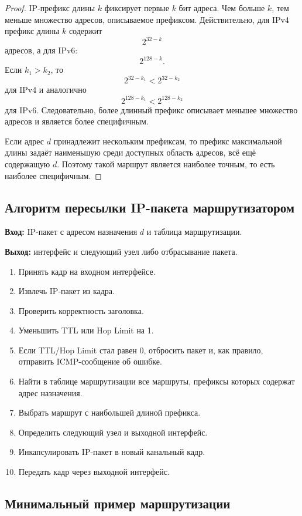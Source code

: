 \documentclass[12pt,a4paper]{article}
\begin{document}
\begin{proof}
IP-префикс длины $k$ фиксирует первые $k$ бит адреса. Чем больше $k$, тем меньше множество адресов, описываемое префиксом. Действительно, для IPv4 префикс длины $k$ содержит
\[
2^{32-k}
\]
адресов, а для IPv6:
\[
2^{128-k}.
\]
Если $k_1 > k_2$, то
\[
2^{32-k_1} < 2^{32-k_2}
\]
для IPv4 и аналогично
\[
2^{128-k_1} < 2^{128-k_2}
\]
для IPv6. Следовательно, более длинный префикс описывает меньшее множество адресов и является более специфичным.

Если адрес $d$ принадлежит нескольким префиксам, то префикс максимальной длины задаёт наименьшую среди доступных область адресов, всё ещё содержащую $d$. Поэтому такой маршрут является наиболее точным, то есть наиболее специфичным.
\end{proof}

\subsection{Алгоритм пересылки IP-пакета маршрутизатором}

\textbf{Вход:} IP-пакет с адресом назначения $d$ и таблица маршрутизации.

\textbf{Выход:} интерфейс и следующий узел либо отбрасывание пакета.

\begin{enumerate}
    \item Принять кадр на входном интерфейсе.
    \item Извлечь IP-пакет из кадра.
    \item Проверить корректность заголовка.
    \item Уменьшить TTL или Hop Limit на 1.
    \item Если TTL/Hop Limit стал равен 0, отбросить пакет и, как правило, отправить ICMP-сообщение об ошибке.
    \item Найти в таблице маршрутизации все маршруты, префиксы которых содержат адрес назначения.
    \item Выбрать маршрут с наибольшей длиной префикса.
    \item Определить следующий узел и выходной интерфейс.
    \item Инкапсулировать IP-пакет в новый канальный кадр.
    \item Передать кадр через выходной интерфейс.
\end{enumerate}

\subsection{Минимальный пример маршрутизации}
\end{document}
